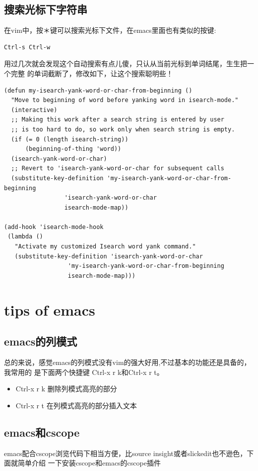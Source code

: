 \documentclass[adobefonts]{ctexart}
\begin{document}
\subsection{搜索光标下字符串}
在vim中，按＊键可以搜索光标下文件，在emacs里面也有类似的按键:
\begin{verbatim}
Ctrl-s Ctrl-w
\end{verbatim}
用过几次就会发现这个自动搜索有点儿傻，只认从当前光标到单词结尾，生生把一个完整
的单词截断了，修改如下，让这个搜索聪明些！
\begin{verbatim}
(defun my-isearch-yank-word-or-char-from-beginning ()
  "Move to beginning of word before yanking word in isearch-mode."
  (interactive)
  ;; Making this work after a search string is entered by user
  ;; is too hard to do, so work only when search string is empty.
  (if (= 0 (length isearch-string))
      (beginning-of-thing 'word))
  (isearch-yank-word-or-char)
  ;; Revert to 'isearch-yank-word-or-char for subsequent calls
  (substitute-key-definition 'my-isearch-yank-word-or-char-from-beginning 
			     'isearch-yank-word-or-char
			     isearch-mode-map))

(add-hook 'isearch-mode-hook
 (lambda ()
   "Activate my customized Isearch word yank command."
   (substitute-key-definition 'isearch-yank-word-or-char 
			      'my-isearch-yank-word-or-char-from-beginning
			      isearch-mode-map)))

\end{verbatim}

\newpage
\section{tips of emacs}
\subsection{emacs的列模式}
总的来说，感觉emacs的列模式没有vim的强大好用,不过基本的功能还是具备的，我常用的
是下面两个快捷键
Ctrl-x r k和Ctrl-x r t。
\begin{itemize}
\item  Ctrl-x r k  删除列模式高亮的部分
\item  Ctrl-x r t  在列模式高亮的部分插入文本
\end{itemize}


\subsection{emacs和cscope}
emacs配合cscope浏览代码下相当方便，比source insight或者slickedit也不逊色，下面就简单介绍
一下安装cscope和emacs的cscope插件
\end{document}
